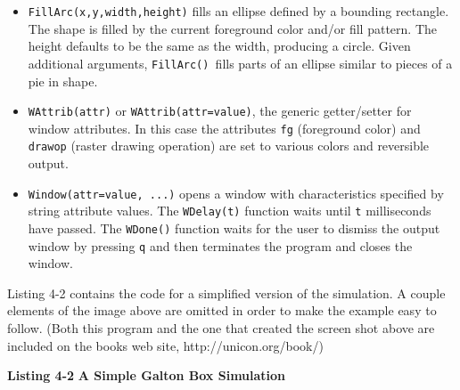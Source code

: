 \begin{itemize}\itemsep0pt
\item \texttt{FillArc(x,y,width,height)} fills an ellipse defined by a
bounding rectangle. The shape is filled by the current foreground color
and/or fill pattern. The height defaults to be the same as the width,
producing a circle. Given additional arguments, \texttt{FillArc()
}fills parts of an ellipse similar to pieces of a pie in shape.
\item \texttt{WAttrib({\textquotedbl}attr{\textquotedbl})} or
\texttt{WAttrib({\textquotedbl}attr=value{\textquotedbl})}, the generic
getter/setter for window attributes.
In this case the attributes \texttt{fg} (foreground color) and
\texttt{drawop} (raster drawing operation) are set to various colors
and reversible output.
\item \texttt{Window({\textquotedbl}attr=value{\textquotedbl}, ...)}
opens a window with characteristics specified by string
attribute values. The \texttt{WDelay(t)} function waits until
\texttt{t} milliseconds have passed. The \texttt{WDone()} function
waits for the user to dismiss the output window by pressing
\texttt{{\textquotedbl}q{\textquotedbl}} and then terminates the
program and closes the window.
\end{itemize}
Listing 4-2 contains the code for a simplified version of the
simulation. A couple elements of the image above are omitted in order
to make the example easy to follow. (Both this program and the one that
created the screen shot above are included on the
book{\textquotesingle}s web site, http://unicon.org/book/)

{\sffamily\bfseries Listing 4-2}
{\sffamily\bfseries A Simple Galton Box Simulation}

